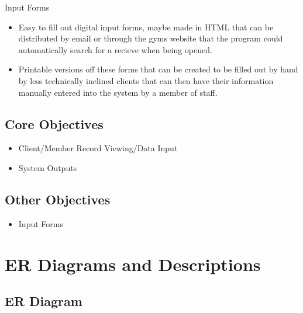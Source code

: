 Input Forms

    \begin{itemize}  

        \item Easy to fill out digital input forms, maybe made in HTML that can be distributed by email or through the gyms website that the program could automatically search for a recieve when being opened.
        \item Printable versions off these forms that can be created to be filled out by hand by less technically inclined clients that can then have their information manually entered into the system by a member of staff.

    \end{itemize}

\subsection{Core Objectives}

\begin{itemize}
    \item Client/Member Record Viewing/Data Input
    \item System Outputs
\end{itemize}


\subsection{Other Objectives}

\begin{itemize}
    \item Input Forms
\end{itemize}

\section{ER Diagrams and Descriptions}


\subsection{ER Diagram}

